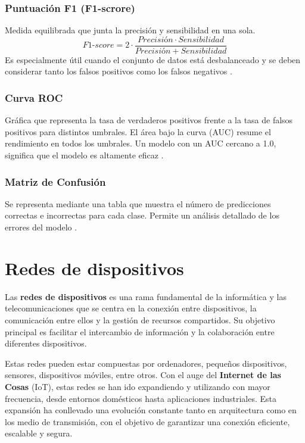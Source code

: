 \subsubsection{Puntuación F1 (F1-scrore)}
\label{subsubsec:F1Score}
Medida equilibrada que junta la precisión y sensibilidad en una sola.
\[\textit{F1-score} = 2 \cdot \frac{Precisión \cdot Sensibilidad}{Precisión + Sensibilidad}\]
Es especialmente útil cuando el conjunto de datos está desbalanceado y se deben considerar tanto los falsos positivos como los falsos negativos \cite{metricas}.

\subsubsection{Curva ROC}
\label{subsubsec:RocCurve}
Gráfica que representa la tasa de verdaderos positivos frente a la tasa de falsos positivos para distintos umbrales. El área bajo la curva (AUC) resume el rendimiento en todos los umbrales. Un modelo con un AUC cercano a 1.0, significa que el modelo es altamente eficaz \cite{roc}.

\subsubsection{Matriz de Confusión}
\label{subsubsec:MatrizConfusion}
Se representa mediante una tabla que muestra el número de predicciones correctas e incorrectas para cada clase. Permite un análisis detallado de los errores del modelo \cite{matriz}.


\section{Redes de dispositivos}
\label{sec:Redes}
Las \textbf{redes de dispositivos} es una rama fundamental de la informática y las telecomunicaciones que se centra en la conexión entre dispositivos, la comunicación entre ellos y la gestión de recursos compartidos. Su objetivo principal es facilitar el intercambio de información y la colaboración entre diferentes dispositivos.

Estas redes pueden estar compuestas por ordenadores, pequeños dispositivos, sensores, dispositivos móviles, entre otros. Con el auge del \textbf{Internet de las Cosas} (IoT), estas redes se han ido expandiendo y utilizando con mayor frecuencia, desde entornos domésticos hasta aplicaciones industriales. Esta expansión ha conllevado una evolución constante tanto en arquitectura como en los medio de transmisión, con el objetivo de garantizar una conexión eficiente, escalable y segura.

